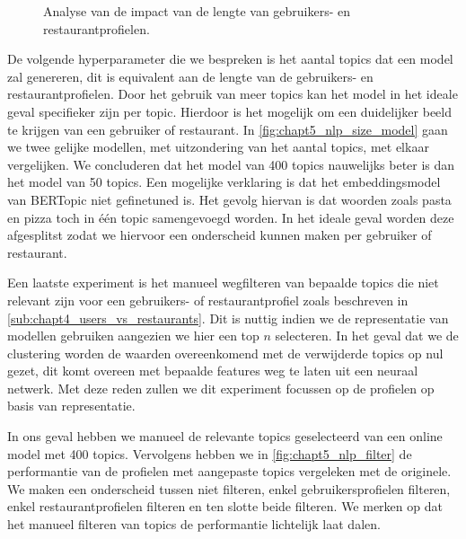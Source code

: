 \begin{figure}[H]
        \caption{Analyse van de impact van de lengte van gebruikers- en restaurantprofielen.}
        \label{fig:chapt5_nlp_size_model}
\end{figure}

De volgende hyperparameter die we bespreken is het aantal topics dat een model zal genereren, dit is equivalent aan de lengte van de gebruikers- en restaurantprofielen. Door het gebruik van meer topics kan het model in het ideale geval specifieker zijn per topic. Hierdoor is het mogelijk om een duidelijker beeld te krijgen van een gebruiker of restaurant. In \autoref{fig:chapt5_nlp_size_model} gaan we twee gelijke modellen, met uitzondering van het aantal topics, met elkaar vergelijken. We concluderen dat het model van 400 topics nauwelijks beter is dan het model van 50 topics. Een mogelijke verklaring is dat het embeddingsmodel van BERTopic niet gefinetuned is. Het gevolg hiervan is dat woorden zoals pasta en pizza toch in één topic samengevoegd worden. In het ideale geval worden deze afgesplitst zodat we hiervoor een onderscheid kunnen maken per gebruiker of restaurant.

Een laatste experiment is het manueel wegfilteren van bepaalde topics die niet relevant zijn voor een gebruikers- of restaurantprofiel zoals beschreven in \autoref{sub:chapt4_users_vs_restaurants}. Dit is nuttig indien we de representatie van modellen gebruiken aangezien we hier een top $n$ selecteren. In het geval dat we de clustering worden de waarden overeenkomend met de verwijderde topics op nul gezet, dit komt overeen met bepaalde features weg te laten uit een neuraal netwerk. Met deze reden zullen we dit experiment focussen op de profielen op basis van representatie. \\


In ons geval hebben we manueel de relevante topics geselecteerd van een online model met 400 topics. Vervolgens hebben we in \autoref{fig:chapt5_nlp_filter} de performantie van de profielen met aangepaste topics vergeleken met de originele. We maken een onderscheid tussen niet filteren, enkel gebruikersprofielen filteren, enkel restaurantprofielen filteren en ten slotte beide filteren. We merken op dat het manueel filteren van topics de performantie lichtelijk laat dalen.

